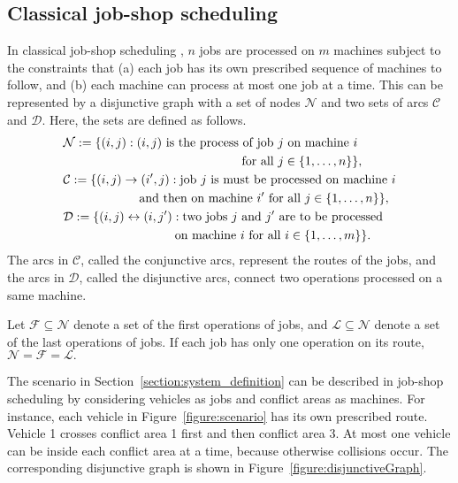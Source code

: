 \documentclass{sig-alternate}
\begin{document}
\subsection{Classical job-shop scheduling}\label{section:classical_job-shop}
In classical job-shop scheduling \cite{pinedo_scheduling_2012}, $n$ jobs are processed on $m$ machines subject to the constraints that (a) each job has its own prescribed sequence of machines to follow, and (b) each machine can process at most one job at a time. 
This can be represented by a disjunctive graph with a set of nodes $\mathcal{N}$ and two sets of arcs $\mathcal{C}$ and $\mathcal{D}$. Here, the sets are defined as follows.
\begin{align*}
	&\mathcal{N}:=\{(i,j): (i,j)~\text{is the process of job $j$ on machine $i$}\\
	& \hspace{2 in}\text{for all }j\in\{1,\ldots,n\}\},\\
	&\mathcal{C}:=\{(i,j)\rightarrow (i',j): \text{job $j$ is must be processed on machine $i$}\\
	&\hspace{0.85 in}\text{and then on machine $i'$ for all }j\in\{1,\ldots,n\}\},\\
	&\mathcal{D}:=\{(i,j)\leftrightarrow (i,j'): \text{two jobs $j$ and $j'$ are to be processed}\\
	&\hspace{1.25 in}\text{on machine $i$ for all } i\in\{1,\ldots,m\}\}.
\end{align*}
The arcs in $\mathcal{C}$, called the conjunctive arcs, represent the routes of the jobs, and the arcs in $\mathcal{D}$, called the disjunctive arcs, connect two operations processed on a same machine. 

Let $\mathcal{F}\subseteq \mathcal{N}$ denote a set of the first operations of jobs, and $\mathcal{L}\subseteq \mathcal{N}$ denote a set of the last operations of jobs. If each job has only one operation on its route, $\mathcal{N}=\mathcal{F}=\mathcal{L}.$ 


The scenario in Section~\ref{section:system_definition} can be described in job-shop scheduling by considering vehicles as jobs and conflict areas as machines. For instance, each vehicle in Figure~\ref{figure:scenario} has its own prescribed route. Vehicle 1 crosses conflict area 1 first and then conflict area 3. At most one vehicle can be inside each conflict area at a time, because otherwise collisions occur. The corresponding disjunctive graph is shown in Figure~\ref{figure:disjunctiveGraph}.
\end{document}
